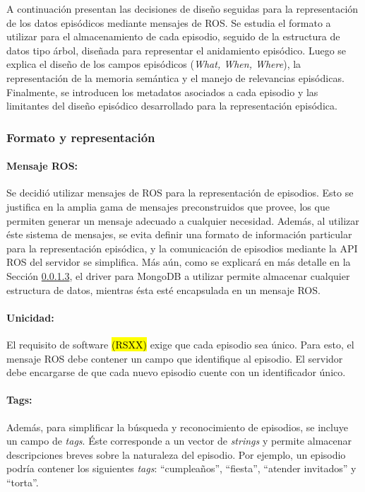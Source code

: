 A continuación presentan las decisiones de diseño seguidas para la representación de los datos episódicos mediante mensajes de ROS. Se estudia el formato a utilizar para el almacenamiento de cada episodio, seguido de la estructura de datos tipo árbol, diseñada para representar el anidamiento episódico. Luego se explica el diseño de los campos episódicos (\textit{What, When, Where}), la representación de la memoria semántica y el manejo de relevancias episódicas. Finalmente, se introducen los metadatos asociados a cada episodio y las limitantes del diseño episódico desarrollado para la representación episódica.


\subsubsection{Formato y representación}

\paragraph{Mensaje ROS:}
Se decidió utilizar mensajes de ROS para la representación de episodios. Esto se justifica en la amplia gama de mensajes preconstruidos que provee, los que permiten generar un mensaje adecuado a cualquier necesidad. Además, al utilizar éste sistema de mensajes, se evita definir una formato de información particular para la representación episódica, y la comunicación de episodios mediante la API ROS del servidor se simplifica. Más aún, como se explicará en más detalle en la Sección \ref{}, el driver para MongoDB a utilizar permite almacenar cualquier estructura de datos, mientras ésta esté encapsulada en un mensaje ROS.

\paragraph{Unicidad:}
El requisito de software \hl{(RSXX)} exige que cada episodio sea único. Para esto, el mensaje ROS debe contener un campo que identifique al episodio. El servidor debe encargarse de que cada nuevo episodio cuente con un identificador único.

\paragraph{Tags:}
Además, para simplificar la búsqueda y reconocimiento de episodios, se incluye un campo de \textit{tags}. Éste corresponde a un vector de \textit{strings} y permite almacenar descripciones breves sobre la naturaleza del episodio. Por ejemplo, un episodio podría contener los siguientes \textit{tags}: ``cumpleaños'', ``fiesta'', ``atender invitados'' y ``torta''.


